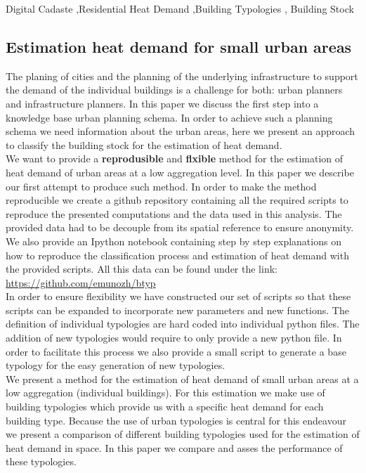 \documentclass[authoryear,preprint,review,12pt]{elsarticle}
\begin{document}
\begin{frontmatter}
\begin{keyword}
    Digital Cadaste \sep Residential Heat Demand \sep Building Typologies \sep
    Building Stock
\end{keyword}

\end{frontmatter}
\begin{linenumbers}

\section{Estimation heat demand for small urban areas}

The planing of cities and the planning of the underlying infrastructure to
support the demand of the individual buildings is a challenge for both: urban
planners and infrastructure planners. In this paper we discuss the first step
into a knowledge base urban planning schema. In order to achieve such a
planning schema we need information about the urban areas, here we present an
approach to classify the building stock for the estimation of heat demand.\\

We want to provide a \textbf{reprodusible} and \textbf{flxible} method for the
estimation of heat demand of urban areas at a low aggregation level. In this
paper we describe our first attempt to produce such method. In order to make
the method reproducible we create a github repository containing all the
required scripts to reproduce the presented computations and the data used in
this analysis. The provided data had to be decouple from its spatial reference
to ensure anonymity. We also provide an Ipython notebook containing step by
step explanations on how to reproduce the classification process and estimation
of heat demand with the provided scripts. All this data can be found under the
link: \url{https://github.com/emunozh/btyp}\\

In order to ensure flexibility we have constructed our set of scripts so that
these scripts can be expanded to incorporate new parameters and new functions.
The definition of individual typologies are hard coded into individual python
files. The addition of new typologies would require to only provide a new
python file. In order to facilitate this process we also provide a small script
to generate a base typology for the easy generation of new typologies.\\

We present a method for the estimation of heat demand of small urban areas at a
low aggregation (individual buildings). For this estimation we make use of
building typologies which provide us with a specific heat demand for each
building type. Because the use of urban typologies is central for this
endeavour we present a comparison of different building typologies used for the
estimation of heat demand in space. In this paper we compare and asses the
performance of these typologies.\\


\end{linenumbers}
\end{document}
